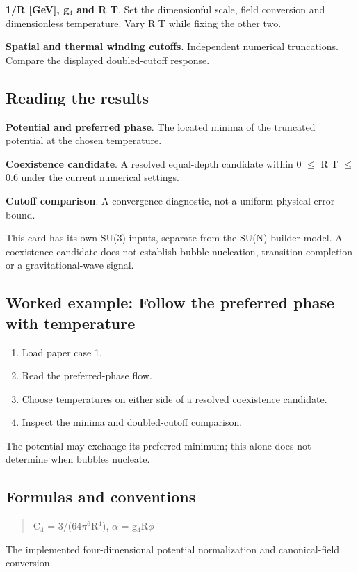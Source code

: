 \documentclass[11pt,a4paper]{article}
\begin{document}
\textbf{1/R [GeV], g\ensuremath{{}_{4}} and R T}. Set the dimensionful scale, field conversion and dimensionless temperature. Vary R T while fixing the other two.

\textbf{Spatial and thermal winding cutoffs}. Independent numerical truncations. Compare the displayed doubled-cutoff response.

\subsection*{Reading the results}
\textbf{Potential and preferred phase}. The located minima of the truncated potential at the chosen temperature.

\textbf{Coexistence candidate}. A resolved equal-depth candidate within 0 \ensuremath{\leq} R T \ensuremath{\leq} 0.6 under the current numerical settings.

\textbf{Cutoff comparison}. A convergence diagnostic, not a uniform physical error bound.

This card has its own SU(3) inputs, separate from the SU(N) builder model. A coexistence candidate does not establish bubble nucleation, transition completion or a gravitational-wave signal.
\subsection*{Worked example: Follow the preferred phase with temperature}
\begin{enumerate}
\item Load paper case 1.
\item Read the preferred-phase flow.
\item Choose temperatures on either side of a resolved coexistence candidate.
\item Inspect the minima and doubled-cutoff comparison.
\end{enumerate}
The potential may exchange its preferred minimum; this alone does not determine when bubbles nucleate.
\subsection*{Formulas and conventions}
\begin{quote}C\ensuremath{{}_{4}} = 3/(64\ensuremath{\pi}\ensuremath{{}^{6}}R\ensuremath{{}^{4}}),  \ensuremath{\alpha} = g\ensuremath{{}_{4}}R\ensuremath{\phi}\end{quote}
The implemented four-dimensional potential normalization and canonical-field conversion.
\end{document}
